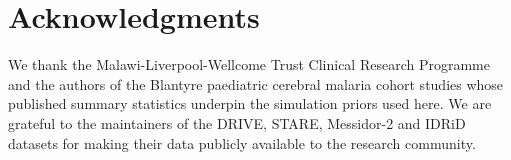 \documentclass[twocolumn,10pt]{article}
\begin{document}
\section*{Acknowledgments}
We thank the Malawi-Liverpool-Wellcome Trust Clinical Research
Programme and the authors of the Blantyre paediatric cerebral
malaria cohort studies whose published summary statistics
underpin the simulation priors used here. We are grateful to the
maintainers of the DRIVE, STARE, Messidor-2 and IDRiD datasets
for making their data publicly available to the research
community.


{\footnotesize

}
\end{document}
